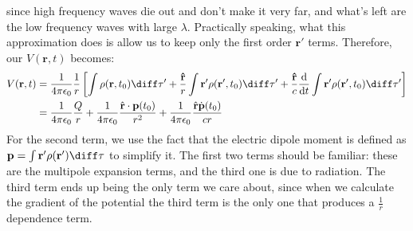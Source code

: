 since high frequency waves die out and don't make it very far, and what's left are the low frequency waves
with large \( \lambda \). Practically speaking, what this approximation does is allow us to keep only the
first order \( \mathbf{r}' \) terms. Therefore, our \( V(\mathbf{r}, t) \) becomes:
\begin{align*}
	V(\mathbf{r}, t) &= \frac{1}{4\pi \epsilon_0} \frac{1}{r}\left[ \int \rho(\mathbf{r}, t_0) \diff \tau' +
	\frac{\mathbf{\hat{r}}}{r} \int \mathbf{r}' \rho(\mathbf{r}', t_0) \diff \tau' +
\frac{\mathbf{\hat{r}}}{c} \dv{t} \int \mathbf{r}' \rho(\mathbf{r}', t_0) \diff \tau' \right]\\
&= \frac{1}{4\pi \epsilon_0}\frac{Q}{r} + \frac{1}{4\pi \epsilon_0} \frac{\hat{\mathbf{r}} \cdot \mathbf{p}(t_0)}{r^2} 
+ \frac{1}{4\pi \epsilon_0} \frac{\hat{\mathbf{r}} \dot{\mathbf{p}}(t_0)}{cr}	
\end{align*}
For the second term, we use the fact that the electric dipole moment is defined as
\( \mathbf{p} = \int \mathbf{r}' \rho(\mathbf{r}') \diff \tau \) to simplify it. The first two terms should
be familiar: these are the multipole expansion terms, and the third one is due to radiation. The third term
ends up being the only term we care about, since when we calculate the gradient of the potential the third
term is the only one that produces a \( \frac{1}{r} \) dependence term. 
 

